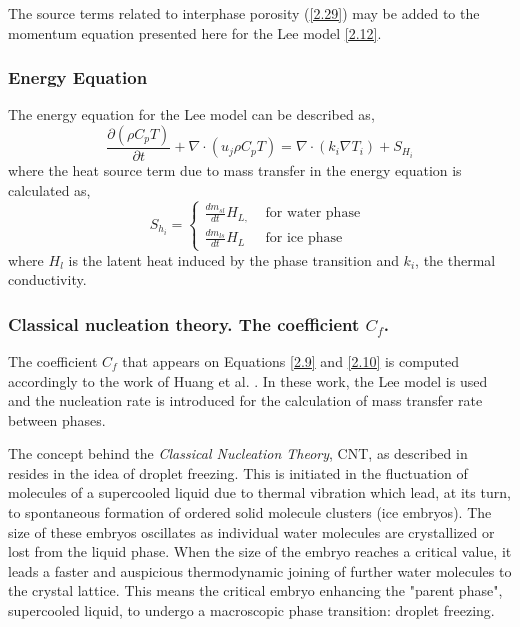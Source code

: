 \noindent The source terms related to interphase porosity (\ref{2.29}) may be added to the momentum equation presented here for the Lee model \ref{2.12}.

\subsubsection{Energy Equation}

\setlength{\parindent}{0.5cm} The energy equation for the Lee model can be described as,
\begin{equation}
	\label{2.14}
	\frac{\partial (\rho C_{p} T)}{\partial t}+\nabla \cdot\left(u_{j}\rho C_{p} T\right)=\nabla \cdot\left(k_{i} \nabla T_{i}\right)+S_{H_{i}}
\end{equation}
where the heat source term due to mass transfer in the energy equation is calculated as,
\begin{equation}
	\label{2.15}
	S_{h_{i}}=\left\{\begin{array}{lr}
	\frac{d m_{s l}}{d t} H_{L,} & \text { for water phase } \\
	\frac{d m_{l s}}{d t} H_{L} & \text { for ice phase }
	\end{array}\right.
\end{equation}
where \textit{$H_l$} is the latent heat induced by the phase transition and \textit{$k_i$}, the thermal conductivity.

\subsubsection{Classical nucleation theory. The coefficient $C_f$.}

\setlength{\parindent}{0.5cm} The coefficient $C_f$ that appears on Equations \ref{2.9} and \ref{2.10} is computed accordingly to the work of Huang et al. \cite{huang_wang_li_2020}. In these work, the Lee model is used and the nucleation rate is introduced for the calculation of mass transfer rate between phases. 

\noindent The concept behind the \textit{Classical Nucleation Theory}, CNT, as described in \cite{ickes_welti_hoose_lohmann_2015} resides in the idea of droplet freezing. This is initiated in the fluctuation of molecules of a supercooled liquid due to thermal vibration which lead, at its turn, to spontaneous formation of ordered solid molecule clusters (ice embryos). The size of these embryos oscillates as individual water molecules are crystallized or lost from the liquid phase. When the size of the embryo reaches a critical value, it leads a faster and auspicious thermodynamic joining of further water molecules to the crystal lattice. This means the critical embryo enhancing the "parent phase", supercooled liquid, to undergo a macroscopic phase transition: droplet freezing.

